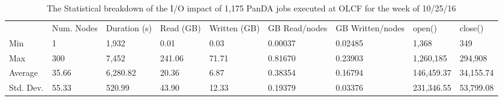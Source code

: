 \begin{table}[t]
\centering
\begin{tabular}{lllllllll}
 & Num. Nodes & Duration (s) & Read (GB) & Written (GB) & GB Read/nodes & GB Written/nodes & open() & close() \\
Min & 1 & 1,932 & 0.01 & 0.03 & 0.00037 & 0.02485 & 1,368 & 349 \\
Max & 300 & 7,452 & 241.06 & 71.71 & 0.81670 & 0.23903 & 1,260,185 & 294,908 \\
Average & 35.66 & 6,280.82 & 20.36 & 6.87 & 0.38354 & 0.16794 & 146,459.37 & 34,155.74 \\
Std. Dev. & 55.33 & 520.99 & 43.90 & 12.33 & 0.19379 & 0.03376 & 231,346.55 & 53,799.08
\end{tabular}
\caption{The Statistical breakdown of the I/O impact of 1,175 PanDA jobs executed at OLCF for the week of 10/25/16}
\label{panda-olcf-stats}
\end{table}
